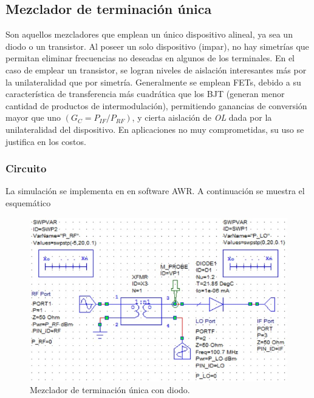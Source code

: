 \documentclass[twocolumn]{article}
\begin{document}
\subsection{Mezclador de terminación única}
Son aquellos mezcladores que emplean un único dispositivo alineal, ya sea un diodo o un transistor. Al poseer un solo dispositivo (impar), no hay simetrías que permitan eliminar frecuencias no deseadas en algunos de los terminales. En el caso de emplear un transistor, se logran niveles de aislación interesantes más por la unilateralidad que por simetría. Generalmente se emplean FETs, debido a su característica de transferencia más cuadrática que los BJT (generan menor cantidad de productos de intermodulación), permitiendo ganancias de conversión mayor que uno $(G_C = P_{IF}/P_{RF})$, y cierta aislación de \textit{OL} dada por la unilateralidad del dispositivo. En aplicaciones no muy comprometidas, su uso se justifica en los costos.

\subsubsection{Circuito}
La simulación se implementa en en software AWR. A continuación se muestra el esquemático
\begin{figure}[h]
  \centering    
	\includegraphics[scale=0.6]{imagenes/circuito1.jpg}
	\caption{Mezclador de terminación única con diodo.}\label{fig:circuito1}
\end{figure}
\end{document}
